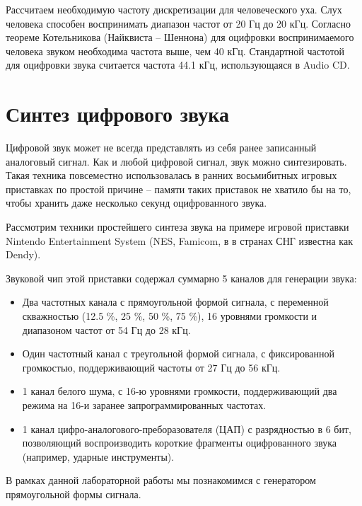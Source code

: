 Рассчитаем необходимую частоту дискретизации для человеческого уха.
Слух человека способен воспринимать диапазон частот от 20 Гц до 20 кГц.
Согласно теореме Котельникова (Найквиста -- Шеннона) для оцифровки воспринимаемого человека звуком необходима частота выше, чем 40 кГц. Стандартной частотой для оцифровки звука считается частота 44.1 кГц, использующаяся в Audio CD.


\section{Синтез цифрового звука}

Цифровой звук может не всегда представлять из себя ранее записанный аналоговый сигнал.
Как и любой цифровой сигнал, звук можно синтезировать.
Такая техника повсеместно использовалась в ранних восьмибитных игровых приставках по простой причине -- памяти таких приставок не хватило бы на то, чтобы хранить даже несколько секунд оцифрованного звука.

Рассмотрим техники простейшего синтеза звука на примере игровой приставки Nintendo Entertainment System (NES, Famicom, в в странах СНГ известна как Dendy).

Звуковой чип этой приставки содержал суммарно 5 каналов для генерации звука:

\begin{itemize}
	\item Два частотных канала с прямоугольной формой сигнала, с переменной скважностью (12.5 \%, 25 \%, 50 \%, 75 \%), 16 уровнями громкости и диапазоном частот от 54 Гц до 28 кГц.
	\item Один частотный канал с треугольной формой сигнала, с фиксированной громкостью, поддерживающий частоты от 27 Гц до 56 кГц.
	\item 1 канал белого шума, с 16-ю уровнями громкости, поддерживающий два режима на 16-и заранее запрограммированных частотах. 
	\item 1 канал цифро-аналогового-преборазователя (ЦАП) с разрядностью в 6 бит, позволяющий воспроизводить короткие фрагменты оцифрованного звука (например, ударные инструменты).

\end{itemize}

В рамках данной лабораторной работы мы познакомимся с генератором прямоугольной формы сигнала.


